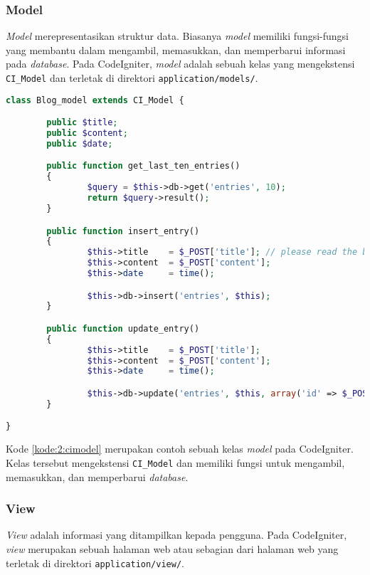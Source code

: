 \subsubsection{Model}
\textit{Model} merepresentasikan struktur data. Biasanya \textit{model} memiliki fungsi-fungsi yang membantu dalam mengambil, memasukkan, dan memperbarui informasi pada \textit{database}. Pada CodeIgniter, \textit{model} adalah sebuah kelas yang mengekstensi \verb|CI_Model| dan terletak di direktori \verb|application/models/|.

\begin{lstlisting}[language=php, caption=Contoh \textit{model}, label=kode:2:cimodel]
class Blog_model extends CI_Model {

        public $title;
        public $content;
        public $date;

        public function get_last_ten_entries()
        {
                $query = $this->db->get('entries', 10);
                return $query->result();
        }

        public function insert_entry()
        {
                $this->title    = $_POST['title']; // please read the below note
                $this->content  = $_POST['content'];
                $this->date     = time();

                $this->db->insert('entries', $this);
        }

        public function update_entry()
        {
                $this->title    = $_POST['title'];
                $this->content  = $_POST['content'];
                $this->date     = time();

                $this->db->update('entries', $this, array('id' => $_POST['id']));
        }

}
\end{lstlisting}

Kode \ref{kode:2:cimodel} merupakan contoh sebuah kelas \textit{model} pada CodeIgniter. Kelas tersebut mengekstensi \verb|CI_Model| dan memiliki fungsi untuk mengambil, memasukkan, dan memperbarui \textit{database}.
	
\subsubsection{View}
\textit{View} adalah informasi yang ditampilkan kepada pengguna. Pada CodeIgniter, \textit{view} merupakan sebuah halaman web atau sebagian dari halaman web yang terletak di direktori \verb|application/view/|.


